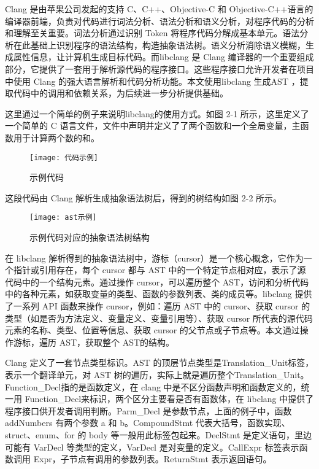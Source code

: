 Clang 是由苹果公司发起的支持 C、C++、Objective-C 和 Objective-C++语言的编译器前端，负责对代码进行词法分析、语法分析和语义分析，对程序代码的分析和理解至关重要\cite{clang}。词法分析通过识别 Token 将程序代码分解成基本单元。语法分析在此基础上识别程序的语法结构，构造抽象语法树。语义分析消除语义模糊，生成属性信息，让计算机生成目标代码。而libclang 是 Clang 编译器的一个重要组成部分，它提供了一套用于解析源代码的程序接口。这些程序接口允许开发者在项目中使用 Clang 的强大语言解析和代码分析功能\cite{libclang}。本文使用libclang 生成AST ，提取代码中的调用和依赖关系，为后续进一步分析提供基础。


这里通过一个简单的例子来说明libclang的使用方式。如图 2-1 所示，这里定义了一个简单的 C 语言文件，文件中声明并定义了了两个函数和一个全局变量，主函数用于计算两个数的和。

\begin{figure}[h]
\centering
\texttt{[image: 代码示例]}
\caption{示例代码}
\end{figure}


这段代码由 Clang 解析生成抽象语法树后，得到的树结构如图 2-2 所示。

\begin{figure}[h]
\centering
\texttt{[image: ast示例]}
\caption{示例代码对应的抽象语法树结构}
\end{figure}

在 libclang 解析得到的抽象语法树中，游标（cursor）是一个核心概念，它作为一个指针或引用存在，每个 cursor 都与 AST 中的一个特定节点相对应，表示了源代码中的一个结构元素。通过操作 cursor，可以遍历整个 AST，访问和分析代码中的各种元素，如获取变量的类型、函数的参数列表、类的成员等。libclang 提供了一系列 API 函数来操作 cursor，例如：遍历 AST 中的 cursor、获取 cursor 的类型（如是否为方法定义、变量定义、变量引用等）、获取 cursor 所代表的源代码元素的名称、类型、位置等信息、获取 cursor 的父节点或子节点等。本文通过操作游标，遍历 AST，获取整个 AST的结构。


Clang 定义了一套节点类型标识。AST 的顶层节点类型是Translation\_Unit标签，表示一个翻译单元，对 AST 树的遍历，实际上就是遍历整个Translation\_Unit。Function\_Decl指的是函数定义，在 clang 中是不区分函数声明和函数定义的，统一用 Function\_Decl来标识，两个区分主要看是否有函数体，在 libclang 中提供了程序接口供开发者调用判断。Parm\_Decl 是参数节点，上面的例子中，函数 addNumbers 有两个参数 a 和 b。CompoundStmt 代表大括号，函数实现、struct、enum、for 的 body 等一般用此标签包起来。DeclStmt 是定义语句，里边可能有 VarDecl 等类型的定义，VarDecl 是对变量的定义。CallExpr 标签表示函数调用 Expr，子节点有调用的参数列表。ReturnStmt 表示返回语句。


